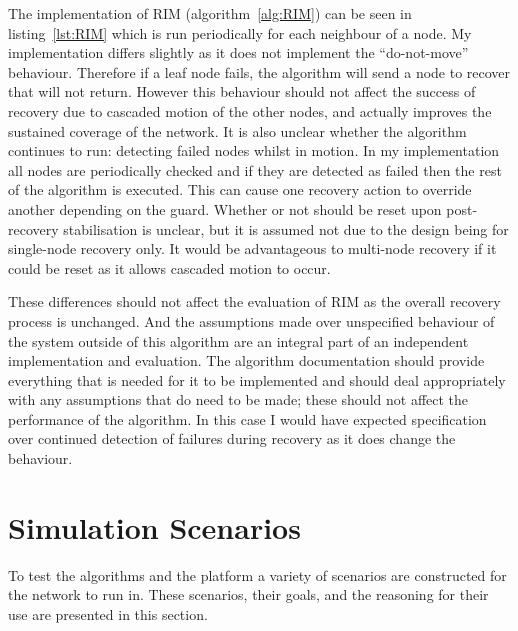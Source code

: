 \documentclass[authoryearcitations]{UoYCSproject}
\begin{document}
The implementation of RIM (algorithm~\ref{alg:RIM}) can be seen in listing~\ref{lst:RIM} which is run periodically for each neighbour of a node. My implementation differs slightly as it does not implement the ``do-not-move'' behaviour. Therefore if a leaf node fails, the algorithm will send a node to recover that will not return. However this behaviour should not affect the success of recovery due to cascaded motion of the other nodes, and actually improves the sustained coverage of the network. It is also unclear whether the algorithm continues to run: detecting failed nodes whilst in motion. In my implementation all nodes are periodically checked and if they are detected as failed then the rest of the algorithm is executed. This can cause one recovery action to override another depending on the  guard. Whether or not  should be reset upon post-recovery stabilisation is unclear, but it is assumed not due to the design being for single-node recovery only. It would be advantageous to multi-node recovery if it could be reset as it allows cascaded motion to occur.

These differences should not affect the evaluation of RIM as the overall recovery process is unchanged. And the assumptions made over unspecified behaviour of the system outside of this algorithm are an integral part of an independent implementation and evaluation. The algorithm documentation should provide everything that is needed for it to be implemented and should deal appropriately with any assumptions that do need to be made; these should not affect the performance of the algorithm. In this case I would have expected specification over continued detection of failures during recovery as it does change the behaviour.


\section{Simulation Scenarios}
\label{sec:scenarios}

To test the algorithms and the platform a variety of scenarios are constructed for the network to run in. These scenarios, their goals, and the reasoning for their use are presented in this section.
\end{document}
